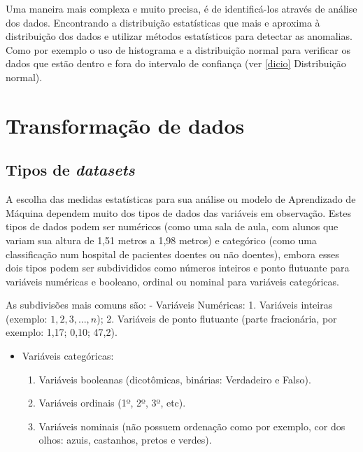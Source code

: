 \documentclass[
]{book}
\providecommand{\tightlist}{%
  \setlength{\itemsep}{0pt}\setlength{\parskip}{0pt}}
\begin{document}
Uma maneira mais complexa e muito precisa, é de identificá-los através de análise dos dados. Encontrando a distribuição estatísticas que mais e aproxima à distribuição dos dados e utilizar métodos estatísticos para detectar as anomalias. Como por exemplo o uso de histograma e a distribuição normal para verificar os dados que estão dentro e fora do intervalo de confiança (ver \ref{dicio} Distribuição normal).

\hypertarget{transformauxe7uxe3o-de-dados}{%
\section{Transformação de dados}\label{transformauxe7uxe3o-de-dados}}

\hypertarget{tipos-de-datasets}{%
\subsection{\texorpdfstring{Tipos de \emph{datasets}}{Tipos de datasets}}\label{tipos-de-datasets}}

A escolha das medidas estatísticas para sua análise ou modelo de Aprendizado de Máquina dependem muito dos tipos de dados das variáveis em observação. Estes tipos de dados podem ser numéricos (como uma sala de aula, com alunos que variam sua altura de 1,51 metros a 1,98 metros) e categórico (como uma classificação num hospital de pacientes doentes ou não doentes), embora esses dois tipos podem ser subdivididos como números inteiros e ponto flutuante para variáveis numéricas e booleano, ordinal ou nominal para variáveis categóricas.

As subdivisões mais comuns são:
- Variáveis Numéricas:
1. Variáveis inteiras (exemplo: \(1,2,3,..., n\));
2. Variáveis de ponto flutuante (parte fracionária, por exemplo: 1,17; 0,10; 47,2).

\begin{itemize}
\tightlist
\item
  Variáveis categóricas:

  \begin{enumerate}
  \def\labelenumi{\arabic{enumi}.}
  \tightlist
  \item
    Variáveis booleanas (dicotômicas, binárias: Verdadeiro e Falso).
  \item
    Variáveis ordinais (1º, 2º, 3º, etc).
  \item
    Variáveis nominais (não possuem ordenação como por exemplo, cor dos olhos: azuis, castanhos, pretos e verdes).
  \end{enumerate}
\end{itemize}
\end{document}
